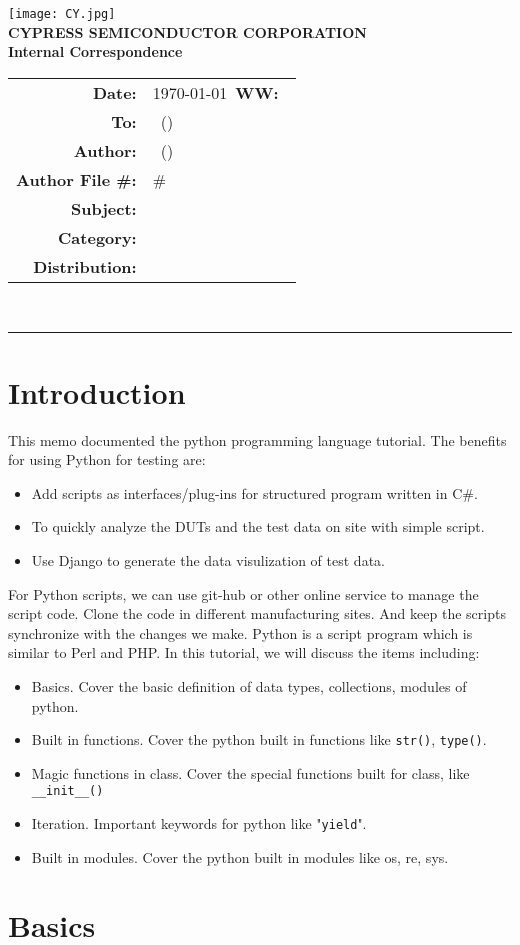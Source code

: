 \documentclass{article}
\renewcommand{\maketitle}
{
    \begin{center}
    \texttt{[image: CY.jpg]}\\
    \vspace{5 mm}
    \large
    {
    \textbf{CYPRESS SEMICONDUCTOR CORPORATION}\\
    \textbf{Internal Correspondence}\\
    }
    \vspace{1 mm}
    \hspace{0.5 in}
    \begin{tabular}{rl}
    \bf Date: & \today\ \hspace{2 in}\textbf{WW:\ }\WorkWeek\\
    \bf To: & \BossName\ (\BossInitials)\\
    \bf Author: & \Author\ (\AuthorInitials)\\
    \bf Author File \#: & \AuthorInitials\#\MemoNumber\\
    \bf Subject: & \Subject\\
    \bf Category: & \Category\\
    \bf Distribution: & \Distribution\\
    \end{tabular}
    \vspace{3 mm}\\
    \hrule
    \end{center}
    
    \thispagestyle{firstpage}
    \pagestyle{normalpage}
}
\begin{document}
\maketitle


\section{Introduction}
This memo documented the python programming language tutorial. The benefits for using Python for
testing are: 
\begin{itemize}
\item
Add scripts as interfaces/plug-ins for structured program written in C\#.
\item
To quickly analyze the DUTs and the test data on site with simple script.
\item
Use Django to generate the data visulization of test data.
\end{itemize}
For Python scripts, we can use git-hub or other online service to manage the
script code.  Clone the code in different manufacturing sites.
And keep the scripts synchronize with the changes we make.
Python is a script program which is similar to Perl and PHP. In this tutorial,
we will discuss the
items including: 
\begin{itemize}
\item
Basics. Cover the basic definition of data types, collections, modules of python.
\item
Built in functions. Cover the python built in functions like \verb/str()/, \verb/type()/.
\item
Magic functions in class. Cover the special functions built for class, like \verb/__init__()/
\item
Iteration. Important keywords for python like "\verb/yield/".
\item
Built in modules. Cover the python built in modules like os, re, sys.
\end{itemize}

\section{Basics}
\end{document}
